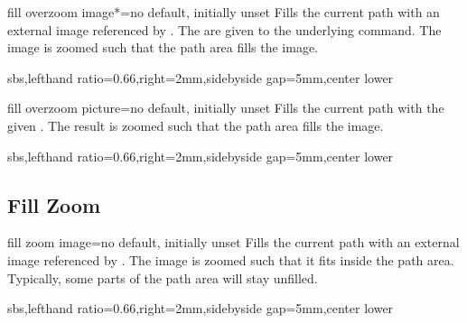 \documentclass[a4paper,11pt]{article}
\begin{document}
\begin{docTikzKey}{fill overzoom image*}{=}{no default, initially unset}
  Fills the current path with an external image referenced by .
  The  are given to the underlying  command.
  The image is zoomed such that the path area fills the image.
\begin{dispExample*}{sbs,lefthand ratio=0.66,right=2mm,sidebyside gap=5mm,center lower}
\end{dispExample*}
\end{docTikzKey}


\begin{docTikzKey}{fill overzoom picture}{=}{no default, initially unset}
  Fills the current path with the given .
  The result is zoomed such that the path area fills the image.
\begin{dispExample*}{sbs,lefthand ratio=0.66,right=2mm,sidebyside gap=5mm,center lower}
\end{dispExample*}
\end{docTikzKey}


\clearpage
\subsection{Fill Zoom}
\begin{docTikzKey}{fill zoom image}{=}{no default, initially unset}
  Fills the current path with an external image referenced by .
  The image is zoomed such that it fits inside the path area.
  Typically, some parts of the path area will stay unfilled.
\begin{dispExample*}{sbs,lefthand ratio=0.66,right=2mm,sidebyside gap=5mm,center lower}
\end{dispExample*}
\end{docTikzKey}
\end{document}
